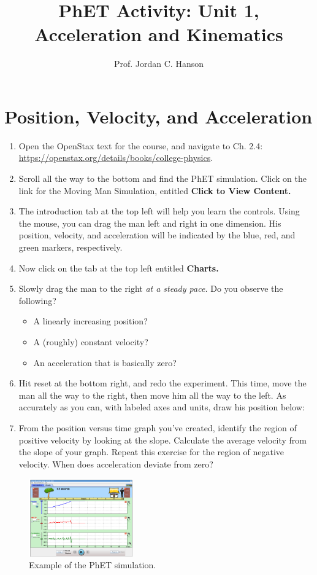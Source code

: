 \documentclass{article}
\begin{document}
\title{PhET Activity: Unit 1, Acceleration and Kinematics}
\author{Prof. Jordan C. Hanson}

\maketitle

\section{Position, Velocity, and Acceleration}

\begin{enumerate}
\item Open the OpenStax text for the course, and navigate to Ch. 2.4: \url{https://openstax.org/details/books/college-physics}.
\item Scroll all the way to the bottom and find the PhET simulation.  Click on the link for the Moving Man Simulation, entitled \textbf{Click to View Content.}
\item The introduction tab at the top left will help you learn the controls.  Using the mouse, you can drag the man left and right in one dimension.  His position, velocity, and acceleration will be indicated by the blue, red, and green markers, respectively.
\item Now click on the tab at the top left entitled \textbf{Charts.}
\item Slowly drag the man to the right \textit{at a steady pace.}  Do you observe the following?
\begin{itemize}
\item A linearly increasing position?
\item A (roughly) constant velocity?
\item An acceleration that is basically zero?
\end{itemize}
\item Hit reset at the bottom right, and redo the experiment.  This time, move the man all the way to the right, then move him all the way to the left.  As accurately as you can, with labeled axes and units, draw his position below: \\ \vspace{2.0cm}
\item From the position versus time graph you've created, identify the region of positive velocity by looking at the slope.  Calculate the average velocity from the slope of your graph.  Repeat this exercise for the region of negative velocity.  When does acceleration deviate from zero?
\end{enumerate}

\begin{figure}[hb]
\centering
\includegraphics[width=0.4\textwidth]{figures/man.png}
\caption{Example of the PhET simulation.}
\end{figure}
\end{document}
